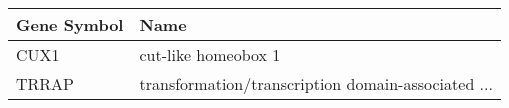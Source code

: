 \begin{tabular}{ll}
\toprule
Gene Symbol &                                               Name \\
\midrule
       CUX1 &                                cut-like homeobox 1 \\
      TRRAP & transformation/transcription domain-associated ... \\
\bottomrule
\end{tabular}
